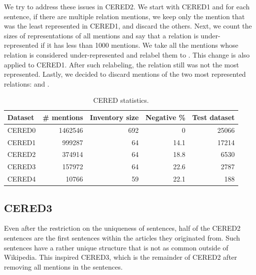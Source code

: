 We try to address these issues in CERED2. We start with CERED1 and for each sentence, if there are multiple relation mentions, we keep only the mention that was the least represented in CERED1, and discard the others. Next, we count the sizes of representations of all mentions and say that a relation is under-represented if it has less than \num{1000} mentions. We take all the mentions whose relation is considered under-represented and relabel them to . This change is also applied to CERED1. After such relabeling, the  relation still was not the most represented. Lastly, we decided to discard mentions of the two most represented relations:  and .

\begin{table}

\caption{CERED statistics.}

\label{table:CEREDsStatistics}

\begin{tabular}{p{} r r r r }

\hline
Dataset & \# mentions & Inventory size & Negative \% & Test dataset\\
\hline
\hline
CERED0 & \num{1462546} & 692 & 0 & \num{25066}\\
CERED1 & \num{999287} & 64 & 14.1 & \num{17214}\\
CERED2 & \num{374914} & 64 & 18.8 & \num{6530}\\
CERED3 & \num{157972} & 64 & 22.6 & \num{2787}\\
CERED4 & \num{10766} & 59 & 22.1 & 188\\
\hline


\end{tabular}

\end{table}






\subsection{CERED3}
Even after the restriction on the uniqueness of sentences, half of the CERED2 sentences are the first sentences within the articles they originated from. Such sentences have a rather unique structure that is not as common outside of Wikipedia. This inspired CERED3, which is the remainder of CERED2 after removing all mentions in the  sentences.

